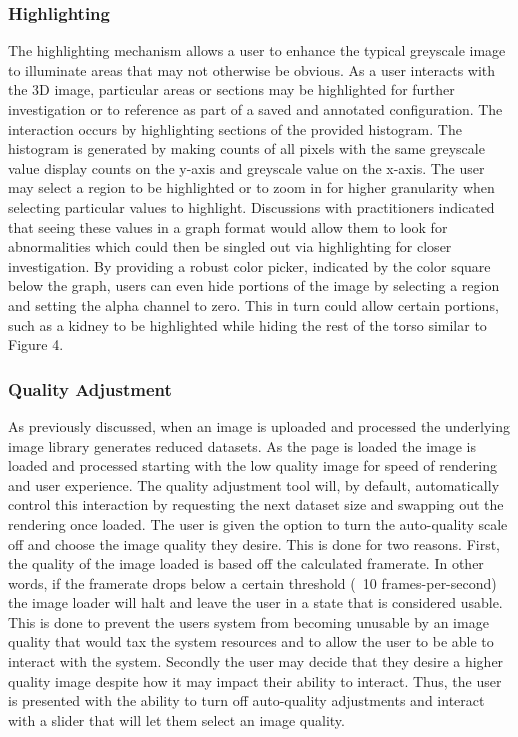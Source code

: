 \documentclass[annual]{acmsiggraph}
\begin{document}
\subsubsection{Highlighting}
	The highlighting mechanism allows a user to enhance the typical greyscale image to illuminate areas that may not otherwise be obvious.  As a user interacts with the 3D image, particular areas or sections may be highlighted for further investigation or to reference as part of a saved and annotated configuration.  The interaction occurs by highlighting sections of the provided histogram.  The histogram is generated by making counts of all pixels with the same greyscale value display counts on the y-axis and greyscale value on the x-axis.  The user may select a region to be highlighted or to zoom in for higher granularity when selecting particular values to highlight.  
	Discussions with practitioners indicated that seeing these values in a graph format would allow them to look for abnormalities which could then be singled out via highlighting for closer investigation.  By providing a robust color picker, indicated by the color square below the graph, users can even hide portions of the image by selecting a region and setting the alpha channel to zero.  This in turn could allow certain portions, such as a kidney to be highlighted while hiding the rest of the torso similar to Figure 4.
	
\subsubsection{Quality Adjustment}
	As previously discussed, when an image is uploaded and processed the underlying image library generates reduced datasets.  As the page is loaded the image is loaded and processed starting with the low quality image for speed of rendering and user experience.  The quality adjustment tool will, by default, automatically control this interaction by requesting the next dataset size and swapping out the rendering once loaded.  The user is given the option to turn the auto-quality scale off and choose the image quality they desire.  This is done for two reasons.  
	First, the quality of the image loaded is based off the calculated framerate.  In other words, if the framerate drops below a certain threshold (~10 frames-per-second) the image loader will halt and leave the user in a state that is considered usable.  This is done to prevent the users system from becoming unusable by an image quality that would tax the system resources and to allow the user to be able to interact with the system.
	Secondly the user may decide that they desire a higher quality image despite how it may impact their ability to interact.  Thus, the user is presented with the ability to turn off auto-quality adjustments and interact with a slider that will let them select an image quality.
\end{document}
